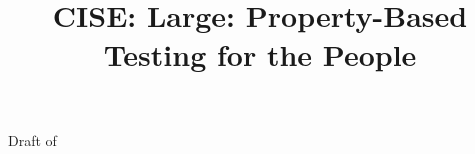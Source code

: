 \documentclass{NSF}
\newcommand{\todo}[1]{\ifdraft {\color{nord-red} TODO: #1} \fi}
\begin{document}
\title{CISE: Large: Property-Based Testing for the People}

\vfil
\begin{center}
{\huge \color{red} Draft of \DTMnow}
\end{center}
\vfil

\newpage





\newpage{}


\newpage{}
\renewcommand\refname{References Cited}

% 


\newpage{}


\newpage{}


% 

% 

\newpage{}


\newpage{}


\newpage

\newpage

\newpage{}

\end{document}
